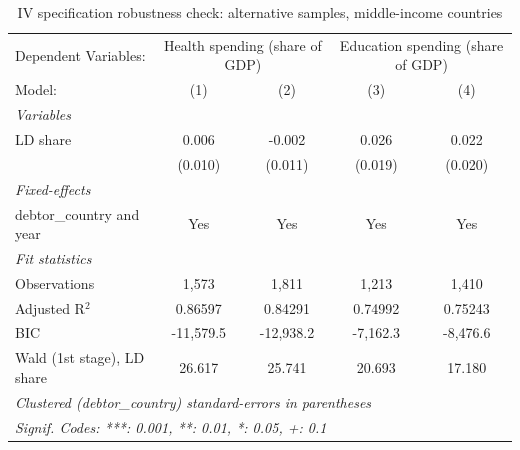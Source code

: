 
\begin{table}[htbp]
   \caption{\label{tab:IV_robustness_sample_changes_other} IV specification robustness check: alternative samples, middle-income countries}
   \centering
   \begin{tabular}{lcccc}
      \tabularnewline \midrule \midrule
      Dependent Variables: & \multicolumn{2}{c}{Health spending (share of GDP)} & \multicolumn{2}{c}{Education spending (share of GDP)}\\
      Model:                     & (1)       & (2)       & (3)      & (4)\\  
      \midrule
      \emph{Variables}\\
      LD share                   & 0.006     & -0.002    & 0.026    & 0.022\\   
                                 & (0.010)   & (0.011)   & (0.019)  & (0.020)\\   
      \midrule
      \emph{Fixed-effects}\\
      debtor\_country and year   & Yes       & Yes       & Yes      & Yes\\  
      \midrule
      \emph{Fit statistics}\\
      Observations               & 1,573     & 1,811     & 1,213    & 1,410\\  
      Adjusted R$^2$             & 0.86597   & 0.84291   & 0.74992  & 0.75243\\  
      BIC                        & -11,579.5 & -12,938.2 & -7,162.3 & -8,476.6\\  
      Wald (1st stage), LD share & 26.617    & 25.741    & 20.693   & 17.180\\  
      \midrule \midrule
      \multicolumn{5}{l}{\emph{Clustered (debtor\_country) standard-errors in parentheses}}\\
      \multicolumn{5}{l}{\emph{Signif. Codes: ***: 0.001, **: 0.01, *: 0.05, +: 0.1}}\\
   \end{tabular}
\end{table}


